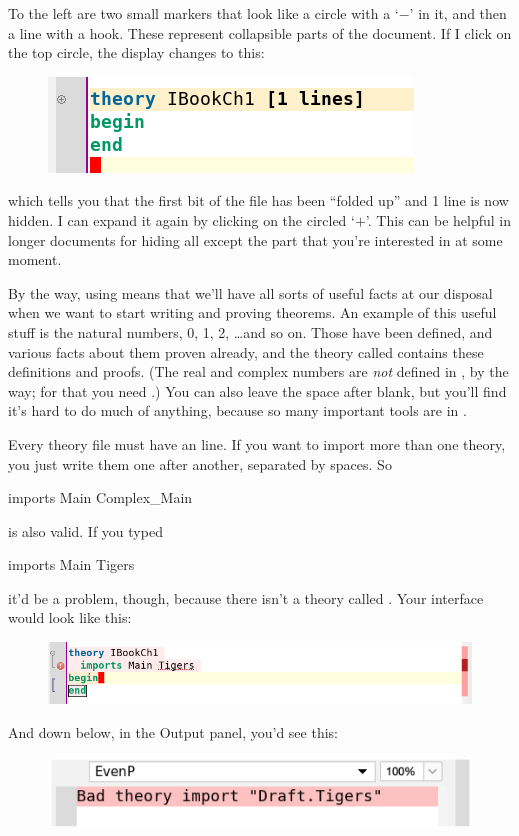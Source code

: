 To the left are two small markers that look like a circle with a `$-$' in it, and then a line with a hook. These represent collapsible parts of the document. If I click on the top circle, the display changes to this:
\begin{figure}[h]
    \centering
    \includegraphics[width=0.5\linewidth]{TEXT/C01//Images/folded-theory.png}
\end{figure}
\noindent which tells you that the first bit of the file has been ``folded up'' and 1 line is now hidden. I can expand it again by clicking on the circled `$+$'. This can be helpful in longer documents for hiding all except the part that you're interested in at some moment. 

By the way, using  means that we'll have all sorts of useful facts at our disposal when we want to start writing and proving theorems. An example of this useful stuff is the natural numbers, 0, 1, 2, \ldots  and so on. Those have been defined, and various facts about them proven already, and the theory called  contains these definitions and proofs. (The real and complex numbers are \textit{not} defined in , by the way; for that you need .) You can also leave the space after  blank, but you'll find it's hard to do much of anything, because so many important tools are in .

Every theory file must have an  line. If you want to import more than one theory, you just write them one after another, separated by spaces. So 
\begin{IS}    
imports Main Complex_Main
\end{IS}
\noindent
is also valid. If you typed
\begin{IS}    
imports Main Tigers
\end{IS}    
\noindent
it'd be a problem, though, because there isn't a theory called . Your interface would look like this:
\begin{figure}[h]
    \centering
    \includegraphics[width=1\linewidth]{TEXT/C01/Images/tigers.png}
\end{figure}
\newpage
And down below, in the Output panel, you'd see this:
\begin{figure}[h]
    \centering
    \includegraphics[width=0.75\linewidth]{TEXT/C01/Images/tiger-error.png}
\end{figure}

